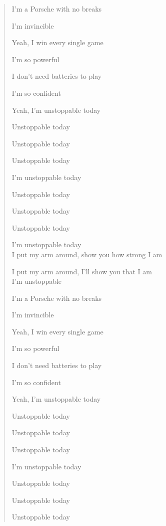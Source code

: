 \documentclass{article}
\begin{document}
\begin{enumerate}
\begin{quotation}
		I'm a Porsche with no breaks
		
		I'm invincible
		
		Yeah, I win every single game
		
		I'm so powerful
		
		I don't need batteries to play
		
		I'm so confident
		
		Yeah, I'm unstoppable today
		
		Unstoppable today
		
		Unstoppable today
		
		Unstoppable today
		
		I'm unstoppable today
		
		Unstoppable today
		
		Unstoppable today
		
		Unstoppable today
		
		I'm unstoppable today
		\\
		
		I put my arm around, show you how strong I am
		
		I put my arm around, I'll show you that I am
		\\
		
		I'm unstoppable
		
		I'm a Porsche with no breaks
		
		I'm invincible
		
		Yeah, I win every single game
		
		I'm so powerful
		
		I don't need batteries to play
		
		I'm so confident
		
		Yeah, I'm unstoppable today
		
		Unstoppable today
		
		Unstoppable today
		
		Unstoppable today
		
		I'm unstoppable today
		
		Unstoppable today
		
		Unstoppable today
		
		Unstoppable today
		

\end{quotation}
\end{enumerate}
\end{document}
